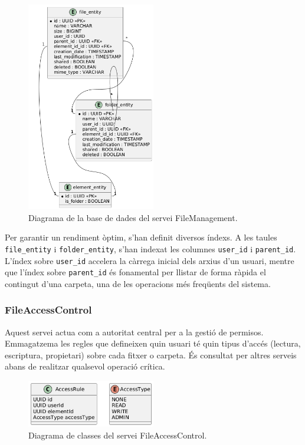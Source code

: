 \begin{figure}[H]
    \centering
    \includegraphics[width=0.5\textwidth]{Figures/diagrama_bd_filemanager.png.png}
    \caption{Diagrama de la base de dades del servei FileManagement.}
    \label{fig:filemgmt_db}
\end{figure}

Per garantir un rendiment òptim, s'han definit diversos índexs. A les taules \texttt{file\_entity} i \texttt{folder\_entity}, s'han indexat les columnes \texttt{user\_id} i \texttt{parent\_id}. L'índex sobre \texttt{user\_id} accelera la càrrega inicial dels arxius d'un usuari, mentre que l'índex sobre \texttt{parent\_id} és fonamental per llistar de forma ràpida el contingut d'una carpeta, una de les operacions més freqüents del sistema.

\subsubsection{FileAccessControl}
Aquest servei actua com a autoritat central per a la gestió de permisos. Emmagatzema les regles que defineixen quin usuari té quin tipus d'accés (lectura, escriptura, propietari) sobre cada fitxer o carpeta. És consultat per altres serveis abans de realitzar qualsevol operació crítica.

\begin{figure}[H]
\centering
    \includegraphics[width=0.5\textwidth]{Figures/diagrama_clases_fileAccesControl.png}
    \caption{Diagrama de classes del servei FileAccessControl.}
    \label{fig:fac_classes}
\end{figure}

